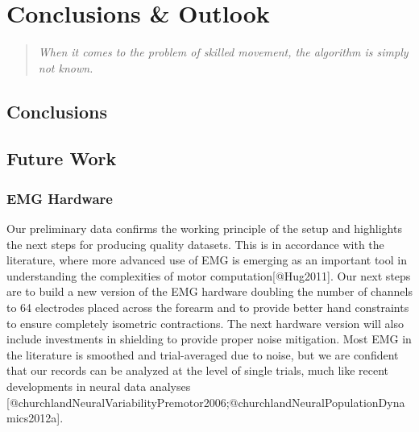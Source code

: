 \documentclass[../main.tex]{subfiles}
\begin{document}
\chapter{Conclusions \& Outlook}\label{chap:conclusions}


\begin{quote}
    \emph{When it comes to the problem of skilled movement, the algorithm is simply not known.}\\ 
\end{quote}


\cleardoublepage%



\section{Conclusions}\label{sec:conclusion}



\section{Future Work}\label{sec:next_steps}


\subsection{EMG Hardware}

Our preliminary data confirms the working principle of the setup and highlights the next steps for producing quality datasets. This is in accordance with the literature, where more advanced use of EMG is emerging as an important tool in understanding the complexities of motor computation[@Hug2011]. Our next steps are to build a new version of the EMG hardware doubling the number of channels to 64 electrodes placed across the forearm and to provide better hand constraints to ensure completely isometric contractions. The next hardware version will also include investments in shielding to provide proper noise mitigation. Most EMG in the literature is smoothed and trial-averaged due to noise, but we are confident that our records can be analyzed at the level of single trials, much like recent developments in neural data analyses [@churchlandNeuralVariabilityPremotor2006;@churchlandNeuralPopulationDynamics2012a].
\end{document}
